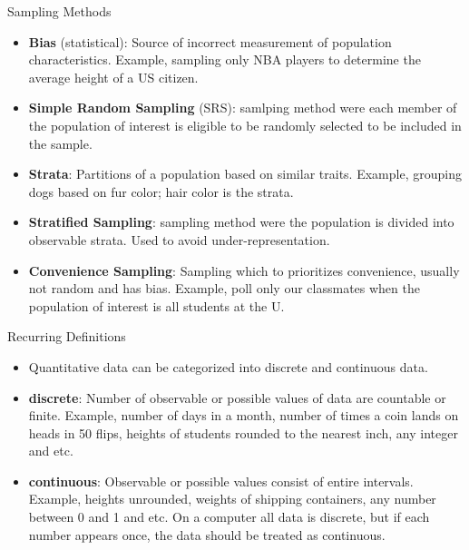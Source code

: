 \documentclass{beamer}
\begin{document}
\begin{frame}{Sampling Methods}
    \begin{itemize}
        \item {\bf Bias} (statistical): Source of incorrect measurement of population characteristics. Example, sampling only NBA players to determine the average height of a US citizen.
        \item {\bf Simple Random Sampling }(SRS): samlping method were each member of the population of interest is eligible to be randomly selected to be included in the sample.
        \item {\bf Strata}: Partitions of a population based on similar traits. Example, grouping dogs based on fur color; hair color is the strata.
        \item {\bf Stratified Sampling}: sampling method were the population is divided into observable strata. Used to avoid under-representation.
        \item {\bf Convenience Sampling}: Sampling which to prioritizes convenience, usually not random and has bias. Example, poll only our classmates when the population of interest is all students at the U.
    \end{itemize}
\end{frame}

\begin{frame}{Recurring Definitions}
    \begin{itemize}
        \item Quantitative data can be categorized into discrete and continuous data.
        \item {\bf discrete}: Number of observable or possible values of data are countable or finite. Example, number of days in a month, number of times a coin lands on heads in 50 flips, heights of students rounded to the nearest inch, any integer and etc.
        \item {\bf continuous}: Observable or possible values consist of entire intervals. Example, heights unrounded, weights of shipping containers, any number between 0 and 1 and etc. On a computer all data is discrete, but if each number appears once, the data should be treated as continuous.
    \end{itemize}
\end{frame}
\end{document}
